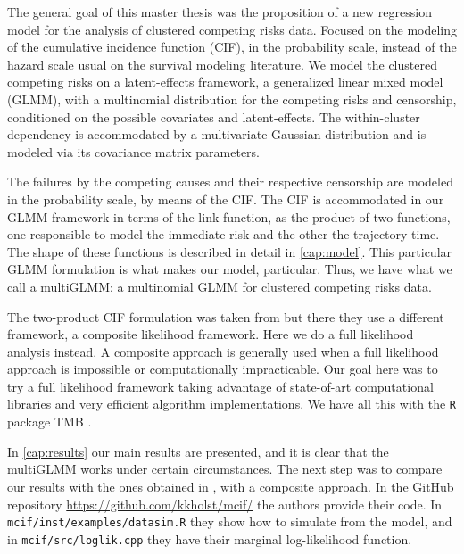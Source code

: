 The general goal of this master thesis was the proposition of a new
regression model for the analysis of clustered competing risks
data. Focused on the modeling of the cumulative incidence function
(CIF), in the probability scale, instead of the hazard scale usual on
the survival modeling literature. We model the clustered competing risks
on a latent-effects framework, a generalized linear mixed model (GLMM),
with a multinomial distribution for the competing risks and censorship,
conditioned on the possible covariates and latent-effects. The
within-cluster dependency is accommodated by a multivariate Gaussian
distribution and is modeled via its covariance matrix parameters.

The failures by the competing causes and their respective censorship are
modeled in the probability scale, by means of the CIF. The CIF is
accommodated in our GLMM framework in terms of the link function, as the
product of two functions, one responsible to model the immediate risk
and the other the trajectory time. The shape of these functions is
described in detail in \autoref{cap:model}. This particular GLMM
formulation is what makes our model, particular. Thus, we have what we
call a multiGLMM: a multinomial GLMM for clustered competing risks data.

The two-product CIF formulation was taken from  but
there they use a different framework, a composite likelihood
framework. Here we do a full likelihood analysis instead. A composite
approach is generally used when a full likelihood approach is impossible
or computationally impracticable. Our goal here was to try a full
likelihood framework taking advantage of state-of-art computational
libraries and very efficient algorithm implementations. We have all this
with the \texttt{R} \cite{R21} package TMB \cite{TMB}.

In \autoref{cap:results} our main results are presented, and it is clear
that the multiGLMM works under certain circumstances. The next step was
to compare our results with the ones obtained in ,
with a composite approach. In the GitHub repository
\url{https://github.com/kkholst/mcif/} the authors provide their code.
In \texttt{mcif/inst/examples/datasim.R} they show how to simulate from
the model, and in \texttt{mcif/src/loglik.cpp} they have their marginal
log-likelihood function.


